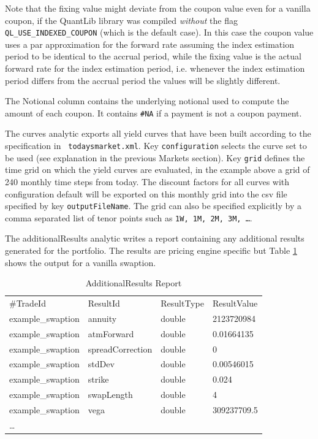 \documentclass[12pt, a4paper]{article}
\begin{document}
Note that the fixing value might deviate from the coupon value even for a vanilla coupon, if the QuantLib library was
compiled {\em without} the flag \verb+QL_USE_INDEXED_COUPON+ (which is the default case). In this case the coupon value
uses a par approximation for the forward rate assuming the index estimation period to be identical to the accrual
period, while the fixing value is the actual forward rate for the index estimation period, i.e. whenever the index estimation
period differs from the accrual period the values will be slightly different.

The Notional column contains the underlying notional used to compute the amount of each coupon. It contains \verb+#NA+
if a payment is not a coupon payment.

The curves analytic exports all yield curves that have been built according to the specification in {\tt
  todaysmarket.xml}. Key {\tt configuration} selects the curve set to be used (see explanation in the previous Markets
section).  Key {\tt grid} defines the time grid on which the yield curves are evaluated, in the example above a grid of
240 monthly time steps from today. The discount factors for all curves with configuration default will be exported on
this monthly grid into the csv file specified by key {\tt outputFileName}. The grid can also be specified explicitly by
a comma separated list of tenor points such as {\tt 1W, 1M, 2M, 3M, \dots}.

The additionalResults analytic writes a report containing any additional results generated for the portfolio. The results are pricing engine specific but Table \ref{additionalreport} shows the output for a vanilla swaption.

\begin{table}[hbt]
\scriptsize
\begin{center}
  \begin{tabular}{l|l|l|l}
\hline
\#TradeId & ResultId & ResultType & ResultValue \\
example\_swaption & annuity & double & 2123720984 \\
example\_swaption & atmForward & double & 0.01664135 \\
example\_swaption & spreadCorrection & double & 0 \\
example\_swaption & stdDev & double & 0.00546015 \\
example\_swaption & strike & double & 0.024 \\
example\_swaption & swapLength & double & 4 \\
example\_swaption & vega & double & 309237709.5 \\
\hline
\hline
\ldots
\end{tabular}
\caption{AdditionalResults Report}
\label{additionalreport}
\end{center}
\end{table}
\end{document}
